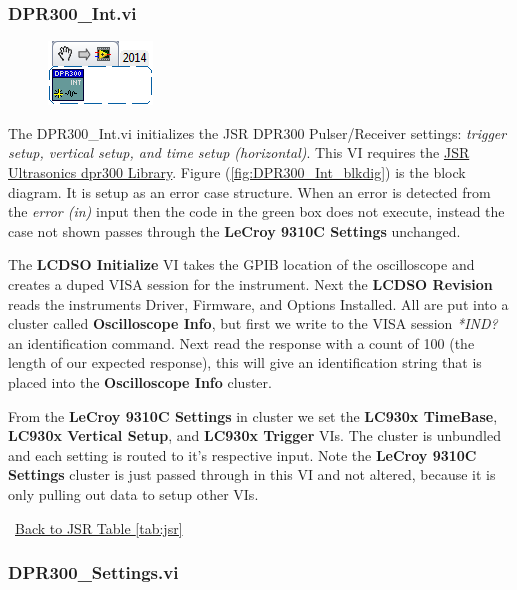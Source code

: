 \documentclass[11pt,a4paper,oldfontcommands]{memoir}
\begin{document}
\subsubsection{DPR300\_Int.vi} \label{DPR300_Int}
\noindent\hrulefill

\begin{figure}[h]
	\includegraphics[scale=0.625]{DPR300_Int_main_02}
	\label{fig:DPR300_Int_main_02}
\end{figure}

The DPR300\_Int.vi initializes the JSR DPR300 Pulser/Receiver settings: \textit{trigger setup, vertical setup, and time setup (horizontal)}. This VI requires the \href{http://sine.ni.com/apps/utf8/niid_web_display.download_page?p_id_guid=EE0D9BE18DD85923E0340003BA7CCD71}{JSR Ultrasonics dpr300 Library}. Figure (\ref{fig:DPR300_Int_blkdig}) is the block diagram.  It is setup as an error case structure. When an error is detected from the \textit{error (in)} input then the code in the green box does not execute, instead the case not shown passes through the \textbf{LeCroy 9310C Settings} unchanged.

The \textbf{LCDSO Initialize} VI takes the GPIB location of the oscilloscope and creates a duped VISA session for the instrument. Next the \textbf{LCDSO Revision} reads the instruments Driver, Firmware, and Options Installed. All are put into a cluster called \textbf{Oscilloscope Info}, but first we write to the VISA session \textit{*IND?} an identification command. Next read the response with a count of 100 (the length of our expected response), this will give an identification string that is placed into the \textbf{Oscilloscope Info} cluster.

From the \textbf{LeCroy 9310C Settings} in cluster we set the \textbf{LC930x TimeBase}, \textbf{LC930x Vertical Setup}, and \textbf{LC930x Trigger} VIs. The cluster is unbundled and each setting is routed to it's respective input. Note the \textbf{LeCroy 9310C Settings} cluster is just passed through in this VI and not altered, because it is only pulling out data to setup other VIs.

\noindent\hrulefill\, \hyperref[tab:jsr]{Back to JSR Table \ref{tab:jsr}}

\subsubsection{DPR300\_Settings.vi} \label{DPR300_settings}
\noindent\hrulefill
\end{document}
